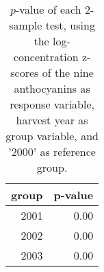 \begin{table}[ht]
\centering
\begin{tabular}{rr}
  \hline
group & p-value \\ 
  \hline
2001 & 0.00 \\ 
  2002 & 0.00 \\ 
  2003 & 0.00 \\ 
   \hline
\end{tabular}
\caption{
            $p$-value of each 2-sample test, using the log-concentration 
            z-scores of the nine anthocyanins as response variable, 
            harvest year as group variable, and '2000' 
            as reference group.
        } 
\label{tbl:3}
\end{table}
